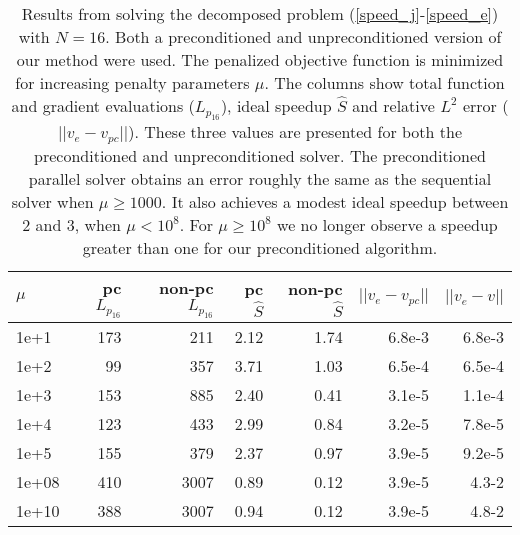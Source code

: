 \begin{table}
\centering
\caption{Results from solving the decomposed problem (\ref{speed_j}-\ref{speed_e}) with $N=16$. Both a preconditioned and unpreconditioned version of our method were used. The penalized objective function is minimized for increasing penalty parameters $\mu$. The columns show total function and gradient evaluations ($L_{p_{16}}$), ideal speedup $\hat S$ and relative $L^2$ error ($||v_e-v_{pc}||$). These three values are presented for both the preconditioned and unpreconditioned solver. The preconditioned parallel solver obtains an error roughly the same as the sequential solver when $\mu\geq 1000$. It also achieves a modest ideal speedup between 2 and 3, when $\mu< 10^8$. For $\mu\geq10^8$ we no longer observe a speedup greater than one for our preconditioned algorithm.}
\label{mu2}
\begin{tabular}{lrrrrrr}
\toprule
{} $\mu$&    pc $L_{p_{16}}$ & non-pc $L_{p_{16}}$  &  pc $\hat S$ & non-pc $\hat S$ &  $||v_e-v_{pc}||$ &      $||v_e-v||$\\
\midrule
1e+1     &  173 &  211 &  2.12&  1.74 &  6.8e-3 &  6.8e-3 \\
1e+2   &   99 &  357 &  3.71 &  1.03 &  6.5e-4 &   6.5e-4\\
1e+3  &  153 &  885 &  2.40 &  0.41 &  3.1e-5 &  1.1e-4 \\
1e+4 &  123 &  433&  2.99 &  0.84 &  3.2e-5 &  7.8e-5 \\
1e+5 &  155 &  379 &  2.37 &  0.97 &  3.9e-5 &  9.2e-5 \\
1e+08 &  410 &  3007 &  0.89 &  0.12 &  3.9e-5 &  4.3-2 \\
1e+10 &  388 &  3007 &  0.94 &  0.12 &  3.9e-5 &  4.8-2 \\
\bottomrule
\end{tabular}
\\
\end{table}
